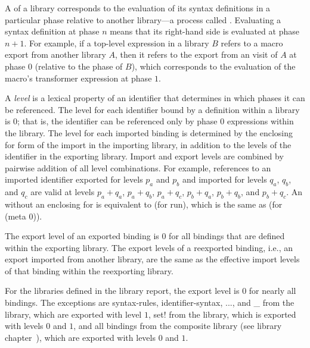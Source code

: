 A  of a library corresponds to the evaluation of its syntax
definitions in a particular phase relative to another
library---a process called . Evaluating a syntax definition
at phase $n$ means that its right-hand side is evaluated at phase $n+1$.
For example, if a top-level expression in a library $B$ refers to
a macro export from another library $A$, then it refers to the export from an
visit of $A$ at phase $0$ (relative to the phase of $B$), which corresponds
to the evaluation of the macro's transformer expression at phase $1$.


%
A \emph{level} is a lexical property of an identifier that determines
in which phases it can be referenced. The level for each identifier
bound by a definition within a library is $0$; that is, the identifier
can be referenced only by phase $0$ expressions within the library.
The level for each imported binding is determined by the enclosing {\cf
  for} form of the {\cf import} in the importing library, in
addition to the levels of the identifier in the exporting
library. Import and export levels are combined by pairwise addition of
all level combinations.  For example, references to an imported
identifier exported for levels $p_a$ and $p_b$ and imported for levels
$q_a$, $q_b$, and $q_c$ are valid at levels $p_a+q_a$, $p_a+q_b$,
$p_a+q_c$, $p_b+q_a$, $p_b+q_b$, and $p_b+q_c$. An 
without an enclosing {\cf for} is equivalent to {\cf (for
   run)}, which is the same as {\cf (for
   (meta 0))}.

The export level of an exported binding is $0$ for all bindings
that are defined within the exporting library. The export levels of a
reexported binding, i.e., an export imported from another library, are the
same as the effective import levels of that binding within the reexporting
library.

For the libraries defined in the library report, the export level is
$0$ for nearly all bindings. The exceptions are {\cf syntax-rules},
{\cf identifier-syntax}, {\cf ...}, and {\cf \_} from the
 library, which are exported with level $1$, {\cf
  set!} from the  library, which is exported with
levels $0$ and $1$, and all bindings from the composite
\thersixlibrary{} library (see library
chapter~), which are
exported with levels $0$ and $1$.

